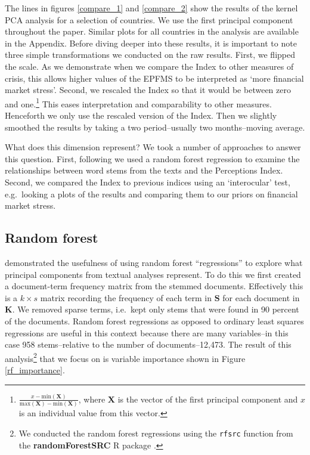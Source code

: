 \documentclass[]{article}
\begin{document}
The lines in figures \ref{compare_1} and \ref{compare_2} show the
results of the kernel PCA analysis for a selection of countries. We use
the first principal component throughout the paper. Similar plots for
all countries in the analysis are available in the Appendix. Before
diving deeper into these results, it is important to note three simple
transformations we conducted on the raw results. First, we flipped the
scale. As we demonstrate when we compare the Index to other measures of
crisis, this allows higher values of the EPFMS to be interpreted as
`more financial market stress'. Second, we rescaled the Index so that it
would be between zero and one.\footnote{\(\frac{x - \mathrm{min}(\bm{X})}{\mathrm{max}(\bm{X}) - \mathrm{min}(\bm{X})}\),
  where \(\bm{X}\) is the vector of the first principal component and
  \(x\) is an individual value from this vector.} This eases
interpretation and comparability to other measures. Henceforth we only
use the rescaled version of the Index. Then we slightly smoothed the
results by taking a two period--usually two months--moving average.

What does this dimension represent? We took a number of approaches to
answer this question. First, following \cite{Spirling2012} we used a random
forest regression \citep{Breiman2001,jones2015} to examine the
relationships between word stems from the texts and the Perceptions
Index. Second, we compared the Index to previous indices using an
`interocular' test, e.g.~looking a plots of the results and comparing
them to our priors on financial market stress.

\subsection{Random forest}\label{random-forest}

\cite[6--8]{Spirling2012} demonstrated the usefulness of using random forest
``regressions'' to explore what principal components from textual
analyses represent. To do this we first created a document-term
frequency matrix from the stemmed documents. Effectively this is a
\(k \times s\) matrix recording the frequency of each term in \(\bm{S}\)
for each document in \(\bm{K}\). We removed sparse terms, i.e.~kept only
stems that were found in 90 percent of the documents. Random forest
regressions as opposed to ordinary least squares regressions are useful
in this context because there are many variables--in this case 958
stems--relative to the number of documents--12,473. The
result of this analysis\footnote{We conducted the random forest
  regressions using the \texttt{rfsrc} function from the
  \textbf{randomForestSRC} R package \citep{randomForestSRCCite}.} that
we focus on is variable importance shown in Figure \ref{rf_importance}.
\end{document}
